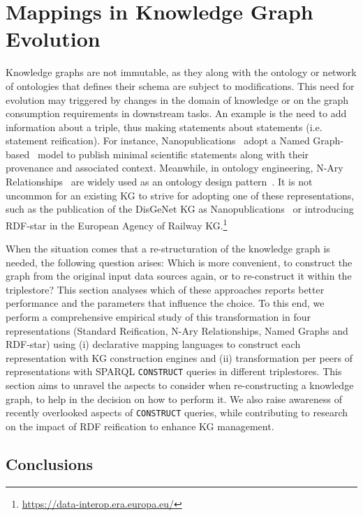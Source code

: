 

\chapter{Mappings in Knowledge Graph Evolution}
\label{chapter:reframing}


Knowledge graphs are not immutable, as they along with the ontology or network of ontologies that defines their schema are subject to modifications. This need for evolution may triggered by changes in the domain of knowledge or on the graph consumption requirements in downstream tasks. 
An example is the need to add information about a triple, thus making statements about statements (i.e. statement reification).
For instance, Nanopublications~\citep{groth2010nanopubs} adopt a Named Graph-based~\citep{carroll2005namedgraphs} model to publish minimal scientific statements along with their provenance and associated context. Meanwhile, in ontology engineering, N-Ary Relationships~\citep{naryw3c2006} are widely used as an ontology design pattern~\citep{gangemi2013multi}. It is not uncommon for an existing KG to strive for adopting one of these representations, such as the publication of the DisGeNet KG as Nanopublications~\citep{queralt2016disgenet} or introducing RDF-star in the European Agency of Railway  KG.\footnote{\url{https://data-interop.era.europa.eu/}}

When the situation comes that a re-structuration of the knowledge graph is needed, the following question arises: Which is more convenient, to construct the graph from the original input data sources again, or to re-construct it within the triplestore? This section analyses which of these approaches reports better performance and the parameters that influence the choice. 
To this end, we perform a comprehensive empirical study of this transformation in four representations (Standard Reification, N-Ary Relationships, Named Graphs and RDF-star) using (i) declarative mapping languages to construct each representation with KG construction engines and (ii) transformation per peers of representations with SPARQL \texttt{CONSTRUCT} queries in different triplestores. This section aims to unravel the aspects to consider when re-constructing a knowledge graph, to help in the decision on how to perform it. We also raise awareness of recently overlooked aspects of \texttt{CONSTRUCT} queries, while contributing to research on the impact of RDF reification to enhance KG management.



\section{Conclusions}


